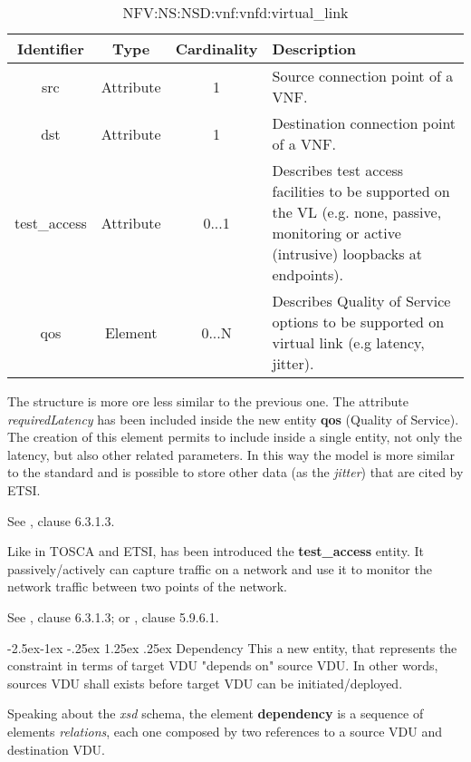 \documentclass[11pt, english]{article}
\makeatletter
\renewcommand\paragraph{\@startsection{paragraph}{4}{\z@}%
            {-2.5ex\@plus -1ex \@minus -.25ex}%
            {1.25ex \@plus .25ex}%
            {\normalfont\normalsize\bfseries}}
\makeatother
\begin{document}
\begin{table}[ht]
    \centering
    \begin{tabular}{c|c|c|m{7cm}}
    \hline
    Identifier & Type & Cardinality & Description \\
    \hline
    \rowcolor{Gray}
    src & Attribute & 1 & Source connection point of a VNF. \\
    \hline
    dst & Attribute & 1 & Destination connection point of a VNF. \\
    \hline
    \rowcolor{Gray}
    test\_access & Attribute & 0...1 & Describes test access facilities to be supported on the VL (e.g. none, passive, monitoring or active (intrusive) loopbacks at endpoints). \\
    \hline
    qos & Element & 0...N &  Describes Quality of Service options to be supported on virtual link (e.g latency, jitter). \\
    \hline
    \end{tabular}
    \caption{NFV:NS:NSD:vnf:vnfd:virtual\_link} \label{tab:tab9}
\end{table}

The structure is more ore less similar to the previous one. The attribute \emph{requiredLatency} has been included inside the new entity \textbf{qos} (Quality of Service). The creation of this element permits to include inside a single entity, not only the latency, but also other related parameters. In this way the model is more similar to the standard and is possible to store other data (as the \textit{jitter}) that are cited by ETSI.

See \cite{etsi}, clause 6.3.1.3.

Like in TOSCA and ETSI, has been introduced the \textbf{test\_access} entity. It passively/actively can  capture traffic on a network and use it to monitor the network traffic between two points of the network.

See \cite{etsi}, clause 6.3.1.3; or \cite{tosca}, clause 5.9.6.1.

\paragraph{Dependency}
This a new entity, that represents the constraint in terms of target VDU "depends on" source VDU. In other words, sources VDU shall exists before target VDU can be initiated/deployed. 

Speaking about the \textit{xsd} schema, the element \textbf{dependency} is a sequence of elements \emph{relations}, each one composed by two references to a source VDU and destination VDU.
\end{document}
